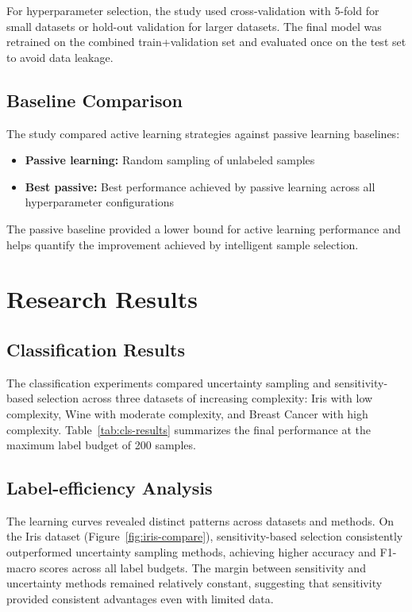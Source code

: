 \documentclass[conference]{IEEEtran}
\begin{document}
For hyperparameter selection, the study used cross-validation with 5-fold for small datasets or hold-out validation for larger datasets. The final model was retrained on the combined train+validation set and evaluated once on the test set to avoid data leakage.

\subsection{Baseline Comparison}

The study compared active learning strategies against passive learning baselines:

\begin{itemize}
\item \textbf{Passive learning:} Random sampling of unlabeled samples
\item \textbf{Best passive:} Best performance achieved by passive learning across all hyperparameter configurations
\end{itemize}

The passive baseline provided a lower bound for active learning performance and helps quantify the improvement achieved by intelligent sample selection.

\section{Research Results}
\subsection{Classification Results}

The classification experiments compared uncertainty sampling and sensitivity-based selection across three datasets of increasing complexity: Iris with low complexity, Wine with moderate complexity, and Breast Cancer with high complexity. Table~\ref{tab:cls-results} summarizes the final performance at the maximum label budget of 200 samples.

\subsection{Label-efficiency Analysis}

The learning curves revealed distinct patterns across datasets and methods. On the Iris dataset (Figure~\ref{fig:iris-compare}), sensitivity-based selection consistently outperformed uncertainty sampling methods, achieving higher accuracy and F1-macro scores across all label budgets. The margin between sensitivity and uncertainty methods remained relatively constant, suggesting that sensitivity provided consistent advantages even with limited data.
\end{document}
